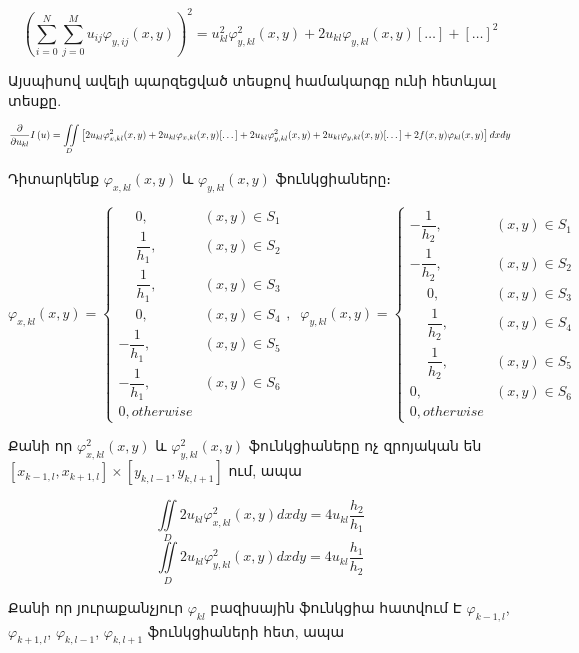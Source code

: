 \documentclass[fleqn, bachelor,subf,12pt,notitlepage]{disser}
\newcommand\scalemath[2]{\scalebox{#1}{\mbox{\ensuremath{\displaystyle #2}}}}
\begin{document}
				$$\left(\sum_{i=0}^{N} \sum_{j=0}^{M}u_{ij}\varphi_{y, ij}(x,y)\right)^2 = u_{kl}^2\varphi_{y, kl}^2(x,y) + 2u_{kl}\varphi_{y, kl}(x,y)[\dots] + [\dots]^2$$

	\noindent Այսպիսով ավելի պարզեցված տեսքով համակարգը ունի հետևյալ տեսքը.

$$\scalemath{0.85}{\frac{\partial}{\partial u_{kl}}I \left(u\right)= \iint \limits_{D} \left[2u_{kl}\varphi_{x, kl}^2(x,y) + 2u_{kl}\varphi_{x, kl}(x,y)[\dots] + 2u_{kl}\varphi_{y, kl}^2(x,y) + 2u_{kl}\varphi_{y, kl}(x,y)[\dots] + 2f(x,y)\varphi_{kl}(x,y)\right]dxdy}$$

\noindent Դիտարկենք $\varphi_{x, kl}(x,y) $ և $\varphi_{y, kl}(x,y) $ ֆունկցիաները։


$$ \varphi_{x, kl}(x,y)  = \begin{cases}
\phantom{-}0, &(x,y) \in S_{1} \\
\phantom{-}\dfrac{1}{h_{1}}, &(x,y) \in S_{2} \\
\phantom{-}\dfrac{1}{h_{1}}, &(x,y) \in S_{3} \\
\phantom{-}0, &(x,y) \in S_{4} \\
-\dfrac{1}{h_{1}}, &(x,y) \in S_{5} \\
-\dfrac{1}{h_{1}}, &(x,y) \in S_{6}\\
0, otherwise
\end{cases}, \;\; \varphi_{y, kl}(x,y)  = \begin{cases}
-\dfrac{1}{h_{2}}, &(x,y) \in S_{1} \\
-\dfrac{1}{h_{2}}, &(x,y) \in S_{2} \\
\phantom{-}0, &(x,y) \in S_{3} \\
\phantom{-}\dfrac{1}{h_{2}}, &(x,y) \in S_{4} \\
\phantom{-}\dfrac{1}{h_{2}}, &(x,y) \in S_{5} \\
0, &(x,y) \in S_{6}\\
0, otherwise
\end{cases} \;
$$

\noindent Քանի որ $\varphi_{x, kl}^2(x,y) $ և $\varphi_{y, kl}^2(x,y) $ ֆունկցիաները ոչ զրոյական են $\left[x_{k-1, l}, x_{k+1, l} \right] \times \left[y_{k, l-1}, y_{k, l+1}\right]$ ում, ապա

$$  \iint \limits_{D} 2u_{kl}\varphi_{x, kl}^2(x,y)dxdy = 4u_{kl}\dfrac{h_{2}}{h_{1}}$$
$$  \iint \limits_{D} 2u_{kl}\varphi_{y, kl}^2(x,y)dxdy = 4u_{kl}\dfrac{h_{1}}{h_{2}}$$

\noindent Քանի որ յուրաքանչյուր $\varphi_{kl}$ բազիսային ֆունկցիա հատվում Է $\varphi_{k-1, l}$, $\varphi_{k+1, l}$, $\varphi_{k, l-1}$, $\varphi_{k, l+1}$ ֆունկցիաների հետ, ապա
\end{document}
